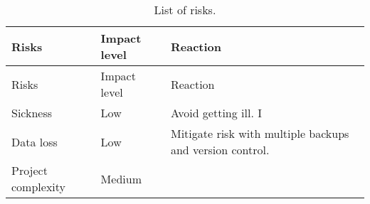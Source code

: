 \begin{longtable}[]{@{}lll@{}}
\caption{List of risks.}\tabularnewline
\toprule
\begin{minipage}[b]{0.28\columnwidth}\raggedright\strut
Risks\strut
\end{minipage} & \begin{minipage}[b]{0.13\columnwidth}\raggedright\strut
Impact level\strut
\end{minipage} & \begin{minipage}[b]{0.50\columnwidth}\raggedright\strut
Reaction\strut
\end{minipage}\tabularnewline
\midrule
\endfirsthead
\toprule
\begin{minipage}[b]{0.28\columnwidth}\raggedright\strut
Risks\strut
\end{minipage} & \begin{minipage}[b]{0.13\columnwidth}\raggedright\strut
Impact level\strut
\end{minipage} & \begin{minipage}[b]{0.50\columnwidth}\raggedright\strut
Reaction\strut
\end{minipage}\tabularnewline
\midrule
\endhead
\begin{minipage}[t]{0.28\columnwidth}\raggedright\strut
Sickness\strut
\end{minipage} & \begin{minipage}[t]{0.13\columnwidth}\raggedright\strut
Low\strut
\end{minipage} & \begin{minipage}[t]{0.50\columnwidth}\raggedright\strut
Avoid getting ill. I\strut
\end{minipage}\tabularnewline
\begin{minipage}[t]{0.28\columnwidth}\raggedright\strut
Data loss\strut
\end{minipage} & \begin{minipage}[t]{0.13\columnwidth}\raggedright\strut
Low\strut
\end{minipage} & \begin{minipage}[t]{0.50\columnwidth}\raggedright\strut
Mitigate risk with multiple backups and version control.\strut
\end{minipage}\tabularnewline
\begin{minipage}[t]{0.28\columnwidth}\raggedright\strut
Project complexity\strut
\end{minipage} & \begin{minipage}[t]{0.13\columnwidth}\raggedright\strut
Medium\strut
\end{minipage} & \begin{minipage}[t]{0.50\columnwidth}\raggedright\strut

\end{minipage}
\end{longtable}
